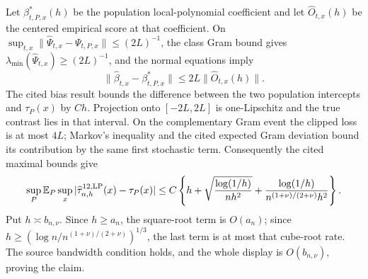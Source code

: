 Let \(\beta^*_{t,P,x}(h)\) be the population local-polynomial coefficient and let \(\widehat O_{t,x}(h)\) be the centered empirical score at that coefficient.  On
\(\sup_{t,x}\|\widehat\Psi_{t,x}-\Psi_{t,P,x}\|\leq(2L)^{-1}\), the class Gram bound gives \(\lambda_{\min}(\widehat\Psi_{t,x})\geq(2L)^{-1}\), and the normal equations imply
\[
 \|\widehat\beta_{t,x}-\beta^*_{t,P,x}\|\leq2L\|\widehat O_{t,x}(h)\|.
\]
The cited bias result bounds the difference between the two population intercepts and \(\tau_P(x)\) by \(Ch\).  Projection onto \([-2L,2L]\) is one-Lipschitz and the true contrast lies in that interval.  On the complementary Gram event the clipped loss is at most \(4L\); Markov's inequality and the cited expected Gram deviation bound its contribution by the same first stochastic term.  Consequently the cited maximal bounds give
\[
 \sup_P\mathbb E_P\sup_x|\widehat\tau^{12,\mathrm{LP}}_{n,h}(x)-\tau_P(x)|
 \leq C\left\{h+\sqrt{\log(1/h)\over nh^2}+{\log(1/h)\over n^{(1+\nu)/(2+\nu)}h^2}\right\}.
\]
Put \(h\asymp b_{n,\nu}\).  Since \(h\geq a_n\), the square-root term is \(O(a_n)\); since \(h\geq(\log n/n^{(1+\nu)/(2+\nu)})^{1/3}\), the last term is at most that cube-root rate.  The source bandwidth condition holds, and the whole display is \(O(b_{n,\nu})\), proving the claim.